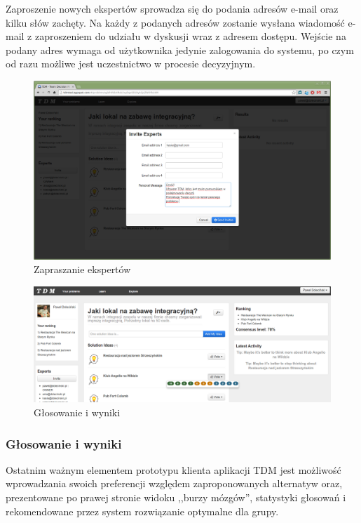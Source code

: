 Zaproszenie nowych ekspertów sprowadza się do podania adresów e-mail oraz kilku
słów zachęty. Na każdy z podanych adresów zostanie wysłana wiadomość e-mail z
zaproszeniem do udziału w dyskusji wraz z adresem dostępu. Wejście na podany
adres wymaga od użytkownika jedynie zalogowania do systemu, po czym od razu
możliwe jest uczestnictwo w procesie decyzyjnym.
\begin{figure}[!htbp]
  \includegraphics[width=\linewidth]
    {chapters/prototyp/tdm_invitation}
  \caption{Zapraszanie ekspertów}
  \label{fig:invitation}
\end{figure}
\begin{figure}[!htbp]
  \includegraphics[width=\linewidth]
    {chapters/prototyp/tdm_results}
  \caption{Głosowanie i wyniki}
  \label{fig:results}
\end{figure}
\subsubsection{Głosowanie i wyniki}
Ostatnim ważnym elementem prototypu klienta aplikacji TDM jest możliwość
wprowadzania swoich preferencji względem zaproponowanych alternatyw oraz,
prezentowane po prawej stronie widoku ,,burzy mózgów'', statystyki głosowań i
rekomendowane przez system rozwiązanie optymalne dla grupy.

